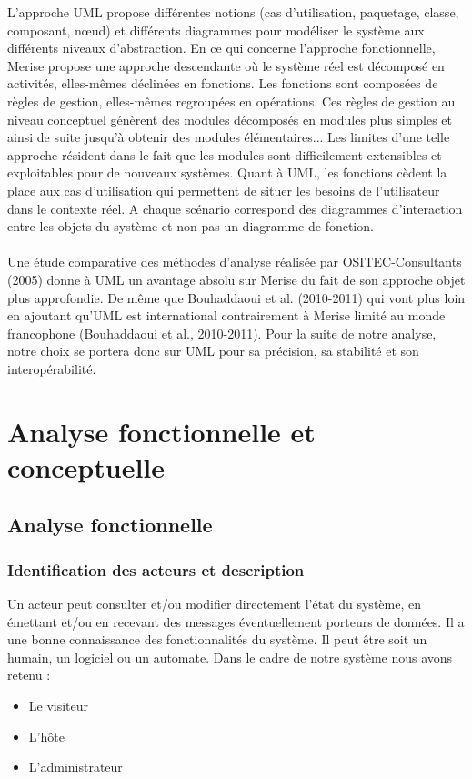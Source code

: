 L'approche UML propose différentes notions (cas d'utilisation, paquetage, classe, composant, nœud) et différents diagrammes pour modéliser le système aux différents niveaux d'abstraction.
En ce qui concerne l'approche fonctionnelle, Merise propose une approche descendante où le système réel est décomposé en activités, elles-mêmes déclinées en fonctions. Les fonctions sont composées de règles de gestion, elles-mêmes regroupées en opérations. Ces règles de gestion au niveau conceptuel génèrent des modules décomposés en modules plus simples et ainsi de suite jusqu'à obtenir des modules élémentaires... Les limites d'une telle approche résident dans le fait que les modules sont difficilement extensibles et exploitables pour de nouveaux systèmes. Quant à UML, les fonctions cèdent la place aux cas d'utilisation qui permettent de situer les besoins de l'utilisateur dans le contexte réel. A chaque scénario correspond des diagrammes d'interaction entre les objets du système et non pas un diagramme de fonction.
\\$ $\\Une étude comparative des méthodes d’analyse réalisée par OSITEC-Consultants (2005) donne à UML un avantage absolu sur Merise du fait de son approche objet plus approfondie. De même que Bouhaddaoui et al. (2010-2011) qui vont plus loin en ajoutant qu’UML est international contrairement à Merise limité au monde francophone (Bouhaddaoui et al., 2010-2011).
Pour la suite de notre analyse, notre choix se portera donc sur UML pour sa précision, sa stabilité et son interopérabilité.

\newpage
\section{Analyse fonctionnelle et conceptuelle} 

\subsection{Analyse fonctionnelle} 
\subsubsection{Identification des acteurs et description} 
Un acteur peut consulter et/ou modifier directement l’état du système, en émettant et/ou en recevant des messages éventuellement porteurs de données. Il a une bonne connaissance des fonctionnalités du système. Il peut être soit un humain, un logiciel ou un automate. Dans le cadre de notre système nous avons retenu :
\begin{itemize}
\item[\textbullet] Le visiteur
\item[\textbullet] L’hôte
\item[\textbullet] L’administrateur
\end{itemize}

